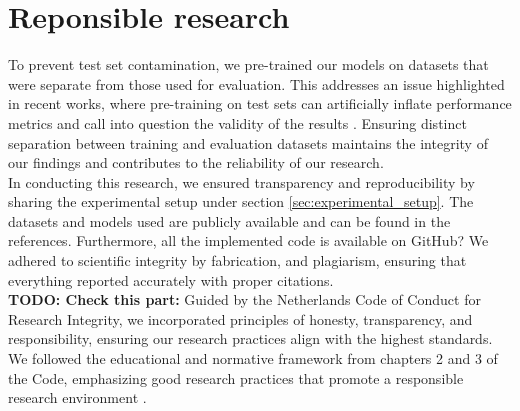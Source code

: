 \section{Reponsible research} %
To prevent test set contamination, we pre-trained our models on datasets that were separate from those used for evaluation. This addresses an issue highlighted in recent works, where pre-training on test sets can artificially inflate performance metrics and call into question the validity of the results \cite{schaeffer2023pretraining}. Ensuring distinct separation between training and evaluation datasets maintains the integrity of our findings and contributes to the reliability of our research.
\\
In conducting this research, we ensured transparency and reproducibility by sharing the experimental setup under section \ref{sec:experimental_setup}. The datasets and models used are publicly available and can be found in the references. Furthermore, all the implemented code is available on GitHub? We adhered to scientific integrity by fabrication, and plagiarism, ensuring that everything reported accurately with proper citations.
\\
\textbf{TODO: Check this part:}
Guided by the Netherlands Code of Conduct for Research Integrity, we incorporated principles of honesty, transparency, and responsibility, ensuring our research practices align with the highest standards. We followed the educational and normative framework from chapters 2 and 3 of the Code, emphasizing good research practices that promote a responsible research environment \cite{knaw2018integrity}. 